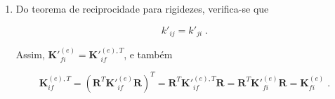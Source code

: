 \begin{enumerate}
	      \[
		      \begin{bmatrix}
			      \mathbf{a}_i \\
			      \mathbf{a}_f \\
		      \end{bmatrix}
		      =
		      \begin{bmatrix}
			      \mathbf{R}^{T}{\mathbf{K'}}_{ii}^{(e)}\mathbf{R} & \mathbf{R}^{T}{\mathbf{K'}}_{if}^{(e)}\mathbf{R} \\
			      \mathbf{R}^{T}\bf{K'}_{fi}^{(e)}\mathbf{R}   & \mathbf{R}^{T}{\mathbf{K'}}_{ff}^{(e)}\mathbf{R} \\
		      \end{bmatrix}
		      \begin{bmatrix}
			      \mathbf{u}_i \\
			      \mathbf{u}_f \\
		      \end{bmatrix}
		      =
		      \begin{bmatrix}
			      \mathbf{K}_{ii}^{(e)} & \mathbf{K}_{if}^{(e)} \\
			      \mathbf{K}_{fi}^{(e)} & \mathbf{K}_{ff}^{(e)} \\
		      \end{bmatrix}
		      \begin{bmatrix}
			      \mathbf{u}_i \\
			      \mathbf{u}_f \\
		      \end{bmatrix}
		      \;,
	      \]

	      \medskip

	      \[ \mathbf{a}=\mathbf{K}^{(e)}\mathbf{u} \;, \]

	      onde \(\mathbf{a}\) é o vetor de ações globais de extremidade de elemento; \(\mathbf{K}^{(e)}\) é a matriz de rigidez global do elemento e \(\mathbf{u}\) é o vetor de deslocamentos globais de elemento.

	\item Do teorema de reciprocidade para rigidezes, verifica-se que

	      \[ k'_{ij}=k'_{ji} \; . \]

	      Assim, \({\mathbf{K'}}_{fi}^{(e)}={\mathbf{K'}}_{if}^{(e),T}\), e também

	      \[ \mathbf{K}_{if}^{(e),T}=(\mathbf{R}^{T}{\mathbf{K'}}_{if}^{(e)}\mathbf{R})^T=\mathbf{R}^{T}{\mathbf{K'}}_{if}^{(e),T}\mathbf{R}=\mathbf{R}^{T}{\mathbf{K'}}_{fi}^{(e)}\mathbf{R}=\mathbf{K}_{fi}^{(e)} \; .\]


\end{enumerate}
